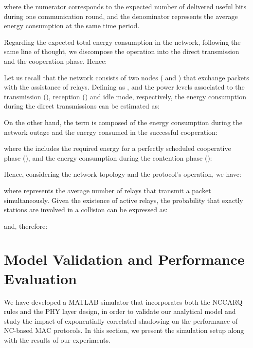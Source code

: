 \documentclass[12pt,draftcls, onecolumn]{IEEEtran}
\begin{document}
where the numerator corresponds to the expected number of delivered useful bits during one communication round, and the denominator represents the average energy consumption at the same time period.

Regarding the expected total energy consumption in the network, following the same line of thought, we discompose the operation into the direct transmission and the cooperation phase. Hence:



Let us recall that the network consists of two nodes ( and ) that exchange packets with the assistance of  relays. Defining as ,  and  the power levels associated to the transmission (), reception () and idle mode, respectively, the energy consumption during the direct transmissions can be estimated as:



On the other hand, the term  is composed of the energy consumption during the network outage and the energy consumed in the successful cooperation:


where the  includes the required energy for a perfectly scheduled cooperative phase (), and the energy consumption during the contention phase ():



Hence, considering the network topology and the protocol's operation, we have:



\footnotesize

\normalsize


where  represents the average number of relays that transmit a packet simultaneously. Given the existence of  active relays, the probability  that exactly  stations are involved in a collision can be expressed as:


and, therefore:




\section{Model Validation and Performance Evaluation}
\label{sec:performance}

We have developed a MATLAB simulator that incorporates both the NCCARQ rules and the PHY layer design, in order to validate our analytical model and study the impact of exponentially correlated shadowing on the performance of NC-based MAC protocols. In this section, we present the simulation setup along with the results of our experiments.
\end{document}
